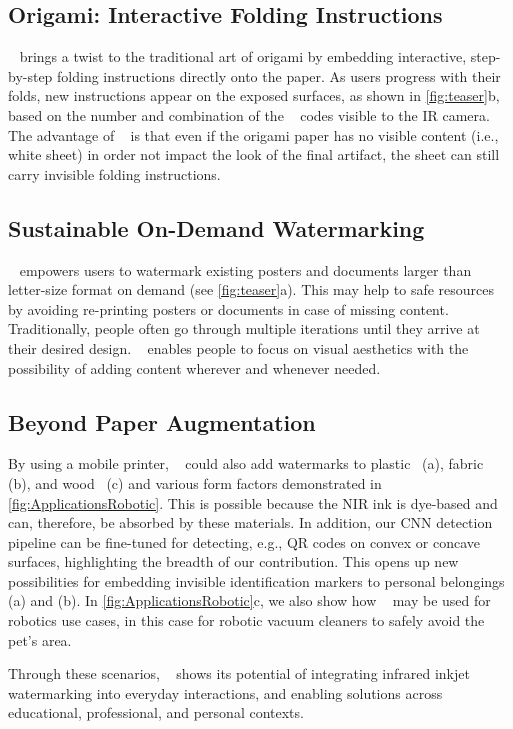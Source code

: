 \subsection{Origami: Interactive Folding Instructions}
\systemName~ brings a twist to the traditional art of origami by embedding interactive, step-by-step folding instructions directly onto the paper. As users progress with their folds, new instructions appear on the exposed surfaces, as shown in \autoref{fig:teaser}b, based on the number and combination of the \systemName~ codes visible to the IR camera.
The advantage of \systemName~ is that even if the origami paper has no visible content (i.e., white sheet) in order not impact the look of the final artifact, the sheet can still carry invisible folding instructions.

\subsection{Sustainable On-Demand Watermarking}
\systemName~ empowers users to watermark existing posters and documents larger than letter-size format on demand (see \autoref{fig:teaser}a). This may help to safe resources by avoiding re-printing posters or documents in case of missing content. Traditionally, people often go through multiple iterations until they arrive at their desired design. \systemName~ enables people to focus on visual aesthetics with the possibility of adding content wherever and whenever needed. 


\subsection{Beyond Paper Augmentation}
By using a mobile printer, \systemName~ could also add watermarks to plastic~\cite{ozdemir_speed-modulated_2024} (a), fabric~\cite{forman_defextiles_2020} (b), and wood~\cite{gui_draw2cut_2025} (c) and various form factors demonstrated in \autoref{fig:ApplicationsRobotic}. This is possible because the NIR ink is dye-based and can, therefore, be absorbed by these materials. In addition, our CNN detection pipeline can be fine-tuned for detecting, e.g., QR codes on convex or concave surfaces, highlighting the breadth of our contribution. This opens up new possibilities for embedding invisible identification markers to personal belongings (a) and (b). In \autoref{fig:ApplicationsRobotic}c, we also show how \systemName~ may be used for robotics use cases, in this case for robotic vacuum cleaners to safely avoid the pet's area.


\vspace{0.2cm}

Through these scenarios, \systemName~ shows its potential of integrating infrared inkjet watermarking into everyday interactions, and enabling solutions across educational, professional, and personal contexts.

